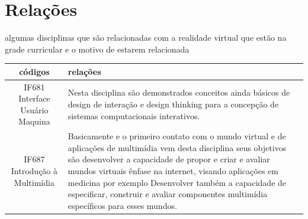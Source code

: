 \documentclass[10pt]{article}
\begin{document}
\section{Relações}


algumas disciplinas que são relacionadas com a realidade virtual que estão na grade curricular e o motivo de estarem relacionada
\begin{center}
\begin{tabular}{|c|p{10cm}|}
\hline
códigos & relações \\ \hline
 IF681 Interface Usuário Maquina &
 Nesta disciplina são demonstrados conceitos ainda básicos de design de interação e design thinking para a concepção de sistemas computacionais interativos.
 \\ \hline
 IF687 Introdução à Multimídia  & 
Basicamente e o primeiro contato com o mundo virtual e de aplicações de multimídia vem desta disciplina seus objetivos são desenvolver a capacidade de propor e criar e avaliar mundos virtuais ênfase na internet, visando aplicações em medicina por exemplo
Desenvolver também a capacidade de especificar, construir e avaliar componentes multimídia específicos para esses mundos. \\ \hline

\end{tabular}    
\end{center}




\end{document}
